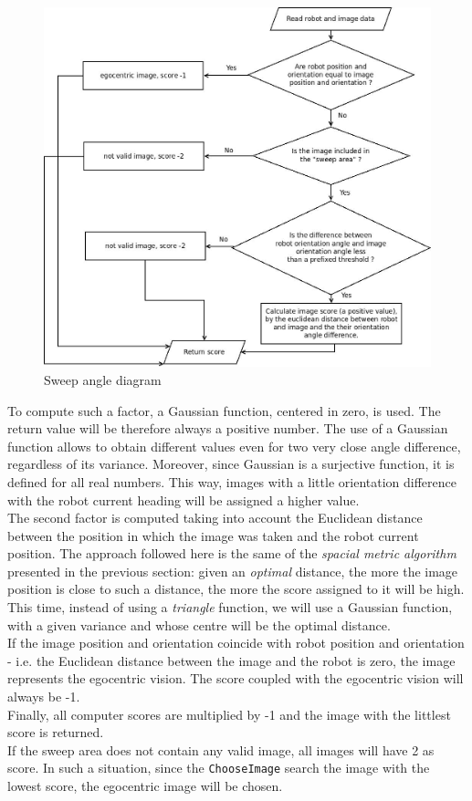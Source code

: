 \begin{figure}[!h]
  \begin{center}
    \includegraphics[width=400pt]{img/sweep_angle_diagram.jpeg} 
    \caption{Sweep angle diagram}
    \label{fig:sweep_angle_diagram}
  \end{center}
\end{figure}

To compute such a factor, a Gaussian function, centered
in zero, is used. The return value will be therefore 
always a positive number.
The use of a Gaussian function allows to obtain different 
values even for two very close angle difference, 
regardless of its variance. 
Moreover, since Gaussian is a surjective function, 
it is defined for all real numbers.
This way, images with a little orientation difference with 
the robot current heading will be assigned a higher value.
\\
The second factor is computed taking into account the Euclidean 
distance between the position in which the image was taken 
and the robot current position. 
The approach followed here is the same of the \textit{spacial 
metric algorithm} presented in the previous section: 
given an \textit{optimal} distance, the more the image position 
is close to such a distance, the more the score assigned 
to it will be high.
This time, instead of using a \textit{triangle} function, 
we will use a Gaussian function, with a given variance and 
whose centre will be the optimal distance.
\\
If the image position and orientation coincide with robot position 
and orientation - i.e. the Euclidean distance between the image and 
the robot is zero, the image represents the egocentric vision. 
The score coupled with the egocentric vision will 
always be -1.
\\
Finally, all computer scores are multiplied by -1 and 
the image with the littlest score is returned.
\\
If the sweep area does not contain any valid image, all images will
have 2 as score. In such a situation, since the \texttt{ChooseImage} 
search the image with the lowest score, the egocentric image 
will be chosen.

